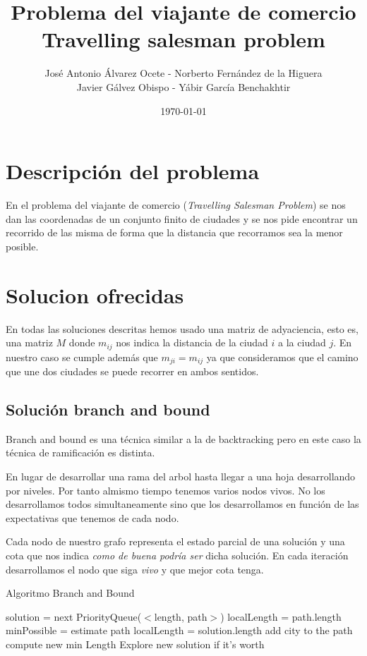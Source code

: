 \documentclass{article}
\title{Problema del viajante de comercio\\ Travelling salesman problem}
\author{José Antonio Álvarez Ocete - Norberto Fernández de la Higuera \\ Javier Gálvez Obispo - Yábir García Benchakhtir }
\date{\today}
\begin{document}
\maketitle
\newpage
\tableofcontents
\newpage

\section{Descripción del problema}

En el problema del viajante de comercio (\textit{Travelling Salesman
  Problem}) se nos dan las coordenadas de un conjunto finito de
ciudades y se nos pide encontrar un recorrido de las misma de forma
que la distancia que recorramos sea la menor posible.

\section{Solucion ofrecidas}

En todas las soluciones descritas hemos usado una matriz de
adyaciencia, esto es, una matriz $M$ donde $m_{ij}$ nos indica la
distancia de la ciudad $i$ a la ciudad $j$. En nuestro caso se cumple
además que $m_{ji} = m_{ij}$ ya que consideramos que el camino que une
dos ciudades se puede recorrer en ambos sentidos.

\subsection{Solución branch and bound}

Branch and bound es una técnica similar a la de backtracking pero en
este caso la técnica de ramificación es distinta.

En lugar de desarrollar una rama del arbol hasta llegar a una hoja
desarrollando por niveles. Por tanto almismo tiempo tenemos varios
nodos vivos. No los desarrollamos todos simultaneamente sino que los
desarrollamos en función de las expectativas que tenemos de cada nodo.

Cada nodo de nuestro grafo representa el estado parcial de una
solución y una cota que nos indica \textit{como de buena podría ser}
dicha solución. En cada iteración desarrollamos el nodo que siga
\textit{vivo} y que mejor cota tenga.


\begin{algorithm}[H]
\caption{Algoritmo Branch and Bound}
\begin{algorithmic}
\State solution = next PriorityQueue($<$length, path$>$)
\State localLength = path.length
\Else
\State minPossible = estimate path
\State localLength = solution.length
\EndIf
{}
\State add city to the path
\State compute new min Length
\State Explore new solution if it's worth
\EndFor
\EndIf
\end{algorithmic}
\end{algorithm}
\end{document}
